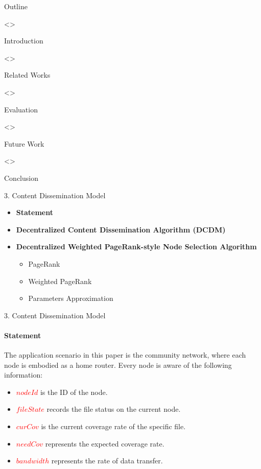 \documentclass{beamer}		%
\begin{document}
\begin{frame}{Outline}
\begin{enumerate}[1. ]
\uncover<>{\item Introduction}
\uncover<>{\item Related Works}
\uncover<>{\item Evaluation}
\uncover<>{\item Future Work}
\uncover<>{\item Conclusion}
\end{enumerate}
\end{frame}

\begin{frame}{3. Content Dissemination Model}
\begin{itemize}
\item \textbf{Statement}
\item \textbf{Decentralized Content Dissemination Algorithm (DCDM)}
\item \textbf{Decentralized Weighted PageRank-style Node Selection Algorithm}
\begin{itemize}
    \item PageRank
    \item Weighted PageRank
    \item Parameters Approximation
\end{itemize}
\end{itemize}
\end{frame}

\begin{frame}{3. Content Dissemination Model}
\framesubtitle{Statement}
The application scenario in this paper is the community network, where each node is embodied as a home router. Every node is aware of the following information:
\[<nodeId,peerList,fileState,curCov,needCov,bandwidth>\]
\begin{itemize}
    \item \textcolor{red}{\(nodeId\)} is the ID of the node.
    \item \textcolor{red}{\(fileState\)} records the file status on the current node.
    \item \textcolor{red}{\(curCov\)} is the current coverage rate of the specific file.
    \item \textcolor{red}{\(needCov\)} represents the expected coverage rate.
    \item \textcolor{red}{\(bandwidth\)} represents the rate of data transfer.
\end{itemize}
\end{frame}
\end{document}

